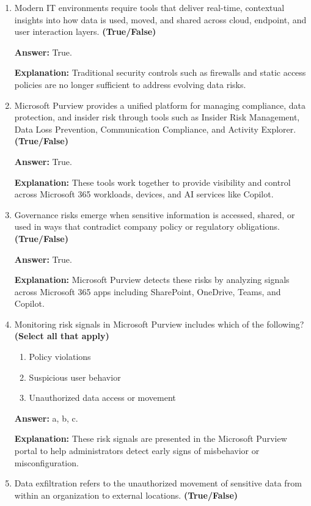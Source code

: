 \documentclass[10pt]{article}
\begin{document}
\begin{enumerate}[leftmargin=*]

\item Modern IT environments require tools that deliver real-time, contextual insights into how data is used, moved, and shared across cloud, endpoint, and user interaction layers. \textbf{(True/False)}

\textbf{Answer:} True.

\textbf{Explanation:} Traditional security controls such as firewalls and static access policies are no longer sufficient to address evolving data risks.

\item Microsoft Purview provides a unified platform for managing compliance, data protection, and insider risk through tools such as Insider Risk Management, Data Loss Prevention, Communication Compliance, and Activity Explorer. \textbf{(True/False)}

\textbf{Answer:} True.

\textbf{Explanation:} These tools work together to provide visibility and control across Microsoft 365 workloads, devices, and AI services like Copilot.

\item Governance risks emerge when sensitive information is accessed, shared, or used in ways that contradict company policy or regulatory obligations. \textbf{(True/False)}

\textbf{Answer:} True.

\textbf{Explanation:} Microsoft Purview detects these risks by analyzing signals across Microsoft 365 apps including SharePoint, OneDrive, Teams, and Copilot.

\item Monitoring risk signals in Microsoft Purview includes which of the following? \textbf{(Select all that apply)}
\begin{enumerate}[label=\alph*., leftmargin=1.5em]
\item Policy violations
\item Suspicious user behavior
\item Unauthorized data access or movement
\end{enumerate}
\textbf{Answer:} a, b, c.

\textbf{Explanation:} These risk signals are presented in the Microsoft Purview portal to help administrators detect early signs of misbehavior or misconfiguration.

\item Data exfiltration refers to the unauthorized movement of sensitive data from within an organization to external locations. \textbf{(True/False)}


\end{enumerate}
\end{document}
